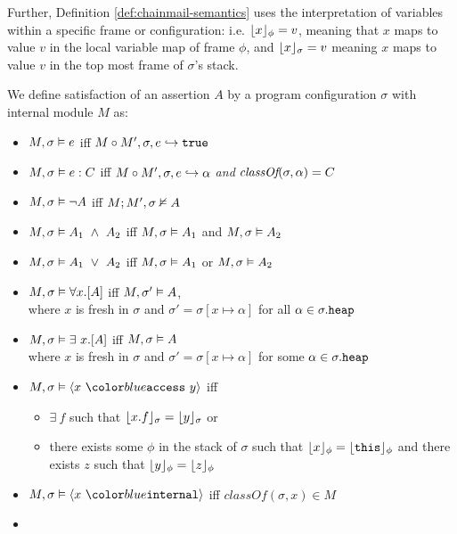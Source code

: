 Further, Definition \ref{def:chainmail-semantics} uses the interpretation of variables
within a specific frame or configuration: i.e. $\lfloor x \rfloor_{\phi} = v$, meaning that $x$ maps to
value $v$ in the local variable map of frame $\phi$, and $\lfloor x \rfloor_{\sigma} = v$ meaning $x$ 
maps to value $v$ in the top most frame of $\sigma$'s stack.
\begin{definition} 
\label{def:chainmail-semantics}
We define satisfaction of an assertion $A$ by a program configuration $\sigma$ with internal module $M$ as:
\begin{itemize}
\item
$M , \sigma \vDash e$ iff $M \circ M', \sigma, e \hookrightarrow \texttt{true}$
\item
$M , \sigma \vDash e : C$ iff $M \circ M', \sigma, e \hookrightarrow \alpha$ \textit{and} $\textit{classOf}(\sigma, \alpha) = C$
\item
$M , \sigma \vDash \neg A$ iff $M ; M', \sigma \nvDash A$
\item
$\satisfiesA{M}{\sigma}{A_1\ \wedge\ A_2}$ iff $M , \sigma \vDash A_1$ and 
$M , \sigma \vDash A_2$
\item
$\satisfiesA{M}{\sigma}{A_1\ \vee\ A_2}$ iff $M , \sigma \vDash A_1$ or 
$M , \sigma \vDash A_2$
\item
$M , \sigma \vDash \forall x.[A]$ iff 
$M , \sigma' \vDash A$,\\
where $x$ is fresh in $\sigma$ and $\sigma' = \sigma[x \mapsto \alpha]$
for all $\alpha \in \sigma.{\texttt{heap}}$
\item
$M , \sigma \vDash \exists\ x.[A]$ iff 
$M , \sigma \vDash A$ \\
where $x$ is fresh in $\sigma$ and $\sigma' = \sigma[x \mapsto \alpha]$
for some $\alpha \in \sigma.{\texttt{heap}}$
\item
$\satisfiesA{M}{\sigma}{\access{x}{y}}$ iff 
\begin{itemize}
\item
$\exists\ f$ such that $\lfloor x.f \rfloor_{\sigma}={\lfloor y \rfloor_{\sigma}}$ or
\item
there exists some $\phi$ in the stack of $\sigma$ such that $\lfloor x \rfloor_{\phi}=\lfloor {\texttt{this}} \rfloor_{\phi}$ 
and there exists $z$ such that $\lfloor y \rfloor_{\phi}=\lfloor z \rfloor_{\phi}$
\end{itemize}
\item
$\satisfiesA{M}{\sigma}{\internal{x}}$ iff 
$\textit{classOf}(\sigma,x) \in M$
\item

\end{itemize}
\end{definition}
